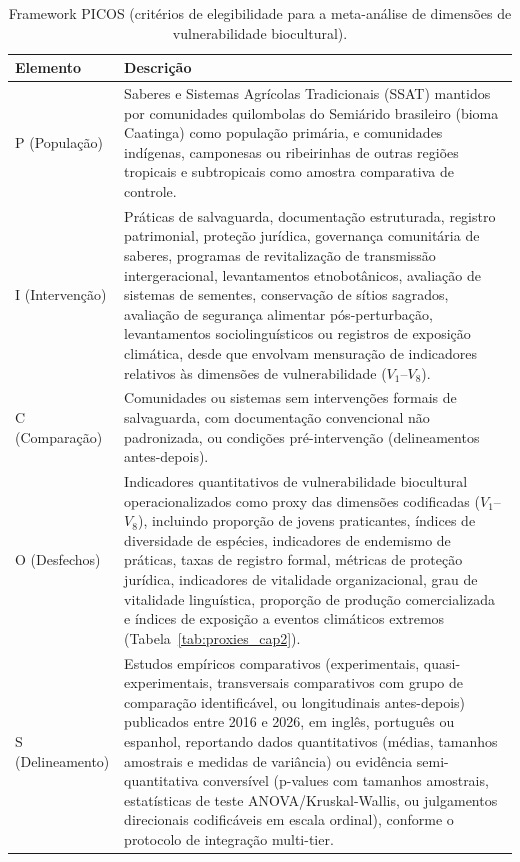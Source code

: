 \begin{table}[htbp]
\caption{Framework PICOS (critérios de elegibilidade para a meta-análise de dimensões de vulnerabilidade biocultural).}
\label{tab:picos_cap2}
\centering
\small
\begin{tabular}{p{2.5cm}p{10.5cm}}
\toprule
\textbf{Elemento} & \textbf{Descrição} \\
\midrule
P (População) & Saberes e Sistemas Agrícolas Tradicionais (SSAT) mantidos por comunidades quilombolas do Semiárido brasileiro (bioma Caatinga) como população primária, e comunidades indígenas, camponesas ou ribeirinhas de outras regiões tropicais e subtropicais como amostra comparativa de controle. \\
I (Intervenção) & Práticas de salvaguarda, documentação estruturada, registro patrimonial, proteção jurídica, governança comunitária de saberes, programas de revitalização de transmissão intergeracional, levantamentos etnobotânicos, avaliação de sistemas de sementes, conservação de sítios sagrados, avaliação de segurança alimentar pós-perturbação, levantamentos sociolinguísticos ou registros de exposição climática, desde que envolvam mensuração de indicadores relativos às dimensões de vulnerabilidade ($V_1$--$V_8$). \\
C (Comparação) & Comunidades ou sistemas sem intervenções formais de salvaguarda, com documentação convencional não padronizada, ou condições pré-intervenção (delineamentos antes-depois). \\
O (Desfechos) & Indicadores quantitativos de vulnerabilidade biocultural operacionalizados como proxy das dimensões codificadas ($V_1$--$V_8$), incluindo proporção de jovens praticantes, índices de diversidade de espécies, indicadores de endemismo de práticas, taxas de registro formal, métricas de proteção jurídica, indicadores de vitalidade organizacional, grau de vitalidade linguística, proporção de produção comercializada e índices de exposição a eventos climáticos extremos (Tabela~\ref{tab:proxies_cap2}). \\
S (Delineamento) & Estudos empíricos comparativos (experimentais, quasi-experimentais, transversais comparativos com grupo de comparação identificável, ou longitudinais antes-depois) publicados entre 2016 e 2026, em inglês, português ou espanhol, reportando dados quantitativos (médias, tamanhos amostrais e medidas de variância) ou evidência semi-quantitativa conversível (p-values com tamanhos amostrais, estatísticas de teste ANOVA/Kruskal-Wallis, ou julgamentos direcionais codificáveis em escala ordinal), conforme o protocolo de integração multi-tier. \\
\bottomrule
\end{tabular}
\end{table}

